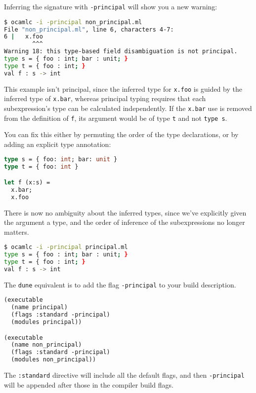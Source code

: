 Inferring the signature with \passthrough{\lstinline!-principal!} will
show you a new warning:

\begin{lstlisting}[language=bash]
$ ocamlc -i -principal non_principal.ml
File "non_principal.ml", line 6, characters 4-7:
6 |   x.foo
        ^^^
Warning 18: this type-based field disambiguation is not principal.
type s = { foo : int; bar : unit; }
type t = { foo : int; }
val f : s -> int
\end{lstlisting}

This example isn't principal, since the inferred type for
\passthrough{\lstinline!x.foo!} is guided by the inferred type of
\passthrough{\lstinline!x.bar!}, whereas principal typing requires that
each subexpression's type can be calculated independently. If the
\passthrough{\lstinline!x.bar!} use is removed from the definition of
\passthrough{\lstinline!f!}, its argument would be of type
\passthrough{\lstinline!t!} and not \passthrough{\lstinline!type s!}.

You can fix this either by permuting the order of the type declarations,
or by adding an explicit type annotation:

\begin{lstlisting}[language=Caml]
type s = { foo: int; bar: unit }
type t = { foo: int }

let f (x:s) =
  x.bar;
  x.foo
\end{lstlisting}

There is now no ambiguity about the inferred types, since we've
explicitly given the argument a type, and the order of inference of the
subexpressions no longer matters.

\begin{lstlisting}[language=bash]
$ ocamlc -i -principal principal.ml
type s = { foo : int; bar : unit; }
type t = { foo : int; }
val f : s -> int
\end{lstlisting}

The \passthrough{\lstinline!dune!} equivalent is to add the flag
\passthrough{\lstinline!-principal!} to your build description.

\begin{lstlisting}[language=Caml]
(executable
  (name principal)
  (flags :standard -principal)
  (modules principal))

(executable
  (name non_principal)
  (flags :standard -principal)
  (modules non_principal))
\end{lstlisting}

The \passthrough{\lstinline!:standard!} directive will include all the
default flags, and then \passthrough{\lstinline!-principal!} will be
appended after those in the compiler build flags.

